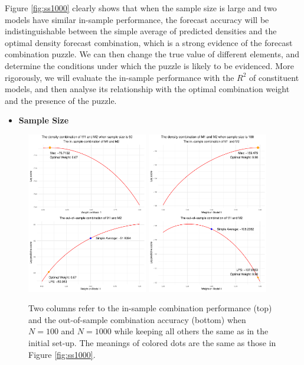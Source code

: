 \documentclass{monashthesis}
\begin{document}
Figure \ref{fig:ss1000} clearly shows that when the sample size is large and two models have similar in-sample performance, the forecast accuracy will be indistinguishable between the simple average of predicted densities and the optimal density forecast combination, which is a strong evidence of the forecast combination puzzle. We can then change the true value of different elements, and determine the conditions under which the puzzle is likely to be evidenced. More rigorously, we will evaluate the in-sample performance with the \(R^2\) of constituent models, and then analyse its relationship with the optimal combination weight and the presence of the puzzle.

\begin{itemize}
\tightlist
\item
  \bf{Sample Size}
\end{itemize}

\begin{figure}
\includegraphics[width=0.47\textwidth]{figures/ss_50.pdf}
\hspace{\fill}
\includegraphics[width=0.47\textwidth]{figures/ss_100.pdf}
\caption{Two columns refer to the in-sample combination performance (top) and the out-of-sample combination accuracy (bottom) when $N=100$ and $N=1000$ while keeping all others the same as in the initial set-up. The meanings of colored dots are the same as those in Figure \ref{fig:ss1000}.}
\label{fig:samplesize}
\end{figure}
\end{document}
